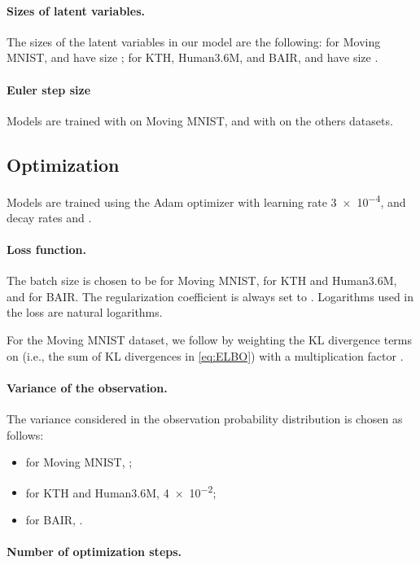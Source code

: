 \documentclass{article}
\begin{document}
\paragraph{Sizes of latent variables.}

The sizes of the latent variables in our model are the following: for Moving MNIST,  and  have size ;  for KTH, Human3.6M, and BAIR,  and  have size .

\paragraph{Euler step size}

Models are trained with  on Moving MNIST, and with  on the others datasets.

\subsection{Optimization}

Models are trained using the Adam optimizer \citep{Kingma2015} with learning rate \num{3e-4}, and decay rates  and .

\paragraph{Loss function.}

The batch size is chosen to be  for Moving MNIST,  for KTH and Human3.6M, and  for BAIR.
The regularization coefficient  is always set to .
Logarithms used in the loss are natural logarithms.

For the Moving MNIST dataset, we follow \citet{Higgins2017} by weighting the KL divergence terms on  (i.e., the sum of KL divergences in \cref{eq:ELBO}) with a multiplication factor .

\paragraph{Variance of the observation.}

The variance  considered in the observation probability distribution  is chosen as follows:
\begin{itemize}
    \item for Moving MNIST, ;
    \item for KTH and Human3.6M,  \num{4e-2};
    \item for BAIR, .
\end{itemize}

\paragraph{Number of optimization steps.}
\end{document}
